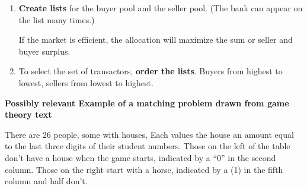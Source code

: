 \begin{enumerate}
\item \textbf{Create lists} for the buyer pool and the seller pool. (The bank can appear on the list many times.) 

If the market is efficient, the allocation will maximize the sum or seller and buyer surplus.

\item To select the set of transactors, \textbf{order the lists}. Buyers from highest to lowest, sellers from lowest to highest.

\end{enumerate}



\newpage
\textbf{Possibly relevant Example of a matching problem drawn from game theory text}

There are 26  people, some with houses, Each values the house an amount equal to the last three digits of their student numbers. Those on the left of the table don't have a house when the game starts, indicated by a ``0'' in the second column. Those on the right  start with a horse, indicated by a  (1) in the fifth column and half don't. 

